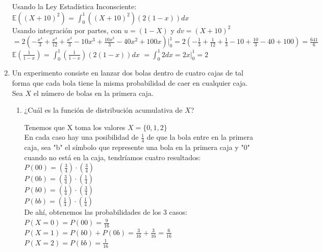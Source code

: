 \documentclass[12pt,a4paper]{report}
\begin{document}
\begin{enumerate}
{			Usando la Ley Estadística Inconsciente:\\
			
			$\mathbb{E}((X+10)^2)$ = $\int_{0}^{1}((X+10)^2)(2(1-x))dx$\\
			Usando integración por partes, con $u = (1-X)$ y $dv = (X+10)^2$\\ 
			$= 2(-\frac{x^4}{3} + \frac{x^4}{12} + \frac{x^3}{3} - 10x^3 + \frac{10x^3}{3} - 40x^2 + 100x)\Big|_{0}^{1} = 2(-\frac{1}{3} + \frac{1}{12} + \frac{1}{3} - 10 + \frac{10}{3} - 40 + 100) = \frac{641}{6}$\\
			
			$\mathbb{E}(\frac{1}{1-x})$ = $\int_{0}^{1}(\frac{1}{1-x})(2(1-x))dx$
			$= \int_{0}^{1}2dx = 2x\Big|_{0}^{1} = 2$\\
			
		}

		\item{
			Un experimento consiste en lanzar dos bolas dentro de cuatro cajas
			de tal forma que cada bola tiene la misma probabilidad de caer en
			cualquier caja. Sea $X$ el número de bolas en la primera caja.
			\begin{enumerate}
				\item {
					¿Cuál es la función de distribución acumulativa de $X$?
					
					Tenemos que X toma los valores $X = \{0,1,2\}$\\
					
					En cada caso hay una posibilidad de $\frac{1}{4}$ de que la bola entre en la primera caja, sea "b" el símbolo que represente una bola en la primera caja y "0" cuando no está en la caja, tendríamos cuatro resultados:\\
					
					$P(00) = (\frac{3}{4})\cdot(\frac{3}{4})$\\
					$P(0b) = (\frac{3}{4})\cdot(\frac{1}{4})$\\
					$P(b0) = (\frac{1}{4})\cdot(\frac{3}{4})$\\
					$P(bb) = (\frac{1}{4})\cdot(\frac{1}{4})$\\
					
					De ahí, obtenemos las probabilidades de los 3 casos:\\
					
					$P(X=0) = P(00) = \frac{9}{16}$\\
					$P(X=1) = P(b0) + P(0b) = \frac{3}{16} + \frac{3}{16} = \frac{6}{16}$\\
					$P(X=2) = P(bb) = \frac{1}{16}$\\
					
}
\end{enumerate}}
\end{enumerate}
\end{document}
